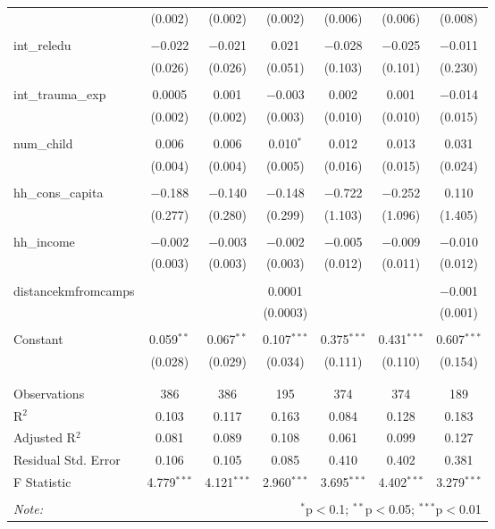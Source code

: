 \begin{table}[H]
\begin{tabular}{@{\extracolsep{4pt}}lcccccc}
  & (0.002) & (0.002) & (0.002) & (0.006) & (0.006) & (0.008) \\ 
  & & & & & & \\ 
 int\_reledu & $-$0.022 & $-$0.021 & 0.021 & $-$0.028 & $-$0.025 & $-$0.011 \\ 
  & (0.026) & (0.026) & (0.051) & (0.103) & (0.101) & (0.230) \\ 
  & & & & & & \\ 
 int\_trauma\_exp & 0.0005 & 0.001 & $-$0.003 & 0.002 & 0.001 & $-$0.014 \\ 
  & (0.002) & (0.002) & (0.003) & (0.010) & (0.010) & (0.015) \\ 
  & & & & & & \\ 
 num\_child & 0.006 & 0.006 & 0.010$^{*}$ & 0.012 & 0.013 & 0.031 \\ 
  & (0.004) & (0.004) & (0.005) & (0.016) & (0.015) & (0.024) \\ 
  & & & & & & \\ 
 hh\_cons\_capita & $-$0.188 & $-$0.140 & $-$0.148 & $-$0.722 & $-$0.252 & 0.110 \\ 
  & (0.277) & (0.280) & (0.299) & (1.103) & (1.096) & (1.405) \\ 
  & & & & & & \\ 
 hh\_income & $-$0.002 & $-$0.003 & $-$0.002 & $-$0.005 & $-$0.009 & $-$0.010 \\ 
  & (0.003) & (0.003) & (0.003) & (0.012) & (0.011) & (0.012) \\ 
  & & & & & & \\ 
 distancekmfromcamps &  &  & 0.0001 &  &  & $-$0.001 \\ 
  &  &  & (0.0003) &  &  & (0.001) \\ 
  & & & & & & \\ 
 Constant & 0.059$^{**}$ & 0.067$^{**}$ & 0.107$^{***}$ & 0.375$^{***}$ & 0.431$^{***}$ & 0.607$^{***}$ \\ 
  & (0.028) & (0.029) & (0.034) & (0.111) & (0.110) & (0.154) \\ 
  & & & & & & \\ 
\hline \\[-1.8ex] 
Observations & 386 & 386 & 195 & 374 & 374 & 189 \\ 
R$^{2}$ & 0.103 & 0.117 & 0.163 & 0.084 & 0.128 & 0.183 \\ 
Adjusted R$^{2}$ & 0.081 & 0.089 & 0.108 & 0.061 & 0.099 & 0.127 \\ 
Residual Std. Error & 0.106 & 0.105 & 0.085 & 0.410 & 0.402 & 0.381 \\ 
F Statistic & 4.779$^{***}$ & 4.121$^{***}$ & 2.960$^{***}$ & 3.695$^{***}$ & 4.402$^{***}$ & 3.279$^{***}$ \\ 
\hline 
\hline \\[-1.8ex] 
\textit{Note:}  & \multicolumn{6}{r}{$^{*}$p$<$0.1; $^{**}$p$<$0.05; $^{***}$p$<$0.01} \\ 
\end{tabular} 
\end{table} 

